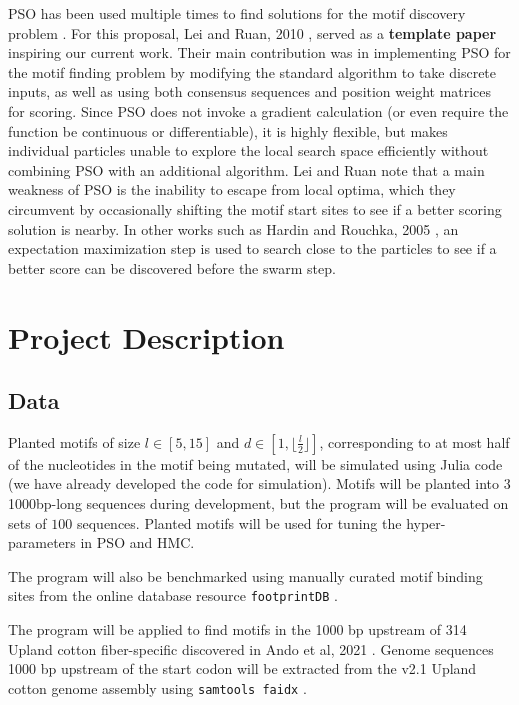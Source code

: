 \documentclass{article}
\begin{document}
PSO has been used multiple times to find solutions for the motif discovery problem \cite{hardin2005dna,lei2010particle,reddy2010planted,ge2019discovery}. For this proposal, Lei and Ruan, 2010 \cite{lei2010particle}, served as a \textbf{template paper} inspiring our current work. Their main contribution was in implementing PSO for the motif finding problem by modifying the standard algorithm to take discrete inputs, as well as using both consensus sequences and position weight matrices for scoring. Since PSO does not invoke a gradient calculation (or even require the function be continuous or differentiable), it is highly flexible, but makes individual particles unable to explore the local search space efficiently without combining PSO with an additional algorithm. Lei and Ruan note that a main weakness of PSO is the inability to escape from local optima, which they circumvent by occasionally shifting the motif start sites to see if a better scoring solution is nearby. In other works such as Hardin and Rouchka, 2005 \cite{hardin2005dna}, an expectation maximization step is used to search close to the particles to see if a better score can be discovered before the swarm step.

\section{Project Description}
\subsection{Data}
Planted motifs of size $l \in [5, 15]$ and $d \in [1, \lfloor \frac{l}{2} \rfloor]$, corresponding to at most half of the nucleotides in the motif being mutated, will be simulated using Julia code (we have already developed the code for simulation). Motifs will be planted into $3$ 1000bp-long sequences during development, but the program will be evaluated on sets of $100$ sequences. Planted motifs will be used for tuning the hyper-parameters in PSO and HMC.  
  
  The program will also be benchmarked using manually curated motif binding sites from the online database resource \texttt{footprintDB} \cite{sebastian2014footprintdb}.  

  The program will be applied to find motifs in the 1000 bp upstream of 314 Upland cotton fiber-specific discovered in Ando et al, 2021 \cite{ando2021lcm}. Genome sequences 1000 bp upstream of the start codon will be extracted from the v2.1 Upland cotton genome assembly \cite{chen2020genomic} using \texttt{samtools faidx} \cite{li2009sequence}.
\end{document}

